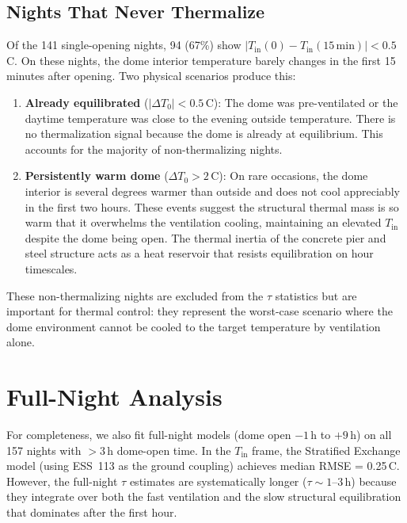 \documentclass[11pt]{article}
\begin{document}
\subsection{Nights That Never Thermalize}

Of the 141 single-opening nights, 94 (67\%) show $|T_\mathrm{in}(0) - T_\mathrm{in}(15\,\mathrm{min})| < 0.5$\,\textdegree C. On these nights, the dome interior temperature barely changes in the first 15 minutes after opening. Two physical scenarios produce this:

\begin{enumerate}
    \item \textbf{Already equilibrated} ($|\Delta T_0| < 0.5$\,\textdegree C): The dome was pre-ventilated or the daytime temperature was close to the evening outside temperature. There is no thermalization signal because the dome is already at equilibrium. This accounts for the majority of non-thermalizing nights.

    \item \textbf{Persistently warm dome} ($\Delta T_0 > 2$\,\textdegree C): On rare occasions, the dome interior is several degrees warmer than outside and does not cool appreciably in the first two hours. These events suggest the structural thermal mass is so warm that it overwhelms the ventilation cooling, maintaining an elevated $T_\mathrm{in}$ despite the dome being open. The thermal inertia of the concrete pier and steel structure acts as a heat reservoir that resists equilibration on hour timescales.
\end{enumerate}

These non-thermalizing nights are excluded from the $\tau$ statistics but are important for thermal control: they represent the worst-case scenario where the dome environment cannot be cooled to the target temperature by ventilation alone.

\section{Full-Night Analysis}

For completeness, we also fit full-night models (dome open $-1$\,h to $+9$\,h) on all 157 nights with $>3$\,h dome-open time. In the $T_\mathrm{in}$ frame, the Stratified Exchange model (using ESS~113 as the ground coupling) achieves median RMSE = 0.25\,\textdegree C. However, the full-night $\tau$ estimates are systematically longer ($\tau \sim 1$--$3$\,h) because they integrate over both the fast ventilation and the slow structural equilibration that dominates after the first hour.
\end{document}
